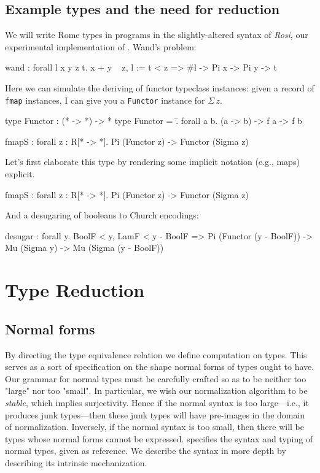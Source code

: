 \documentclass[authoryear, acmsmall, screen, review, nonacm]{acmart} %
\begin{document}
\subsection{Example types and the need for reduction}
We will write Rome types in programs in the slightly-altered syntax of \emph{Rosi}, our experimental implementation of \Rome. 
Wand's problem:

\begin{rosi}
wand : forall l x y z t. x + y ~ z, {l := t} < z => #l -> Pi x -> Pi y -> t
\end{rosi}

Here we can simulate the deriving of functor typeclass instances: given a record of \verb!fmap! instances, I can give you a \verb!Functor! instance for $\Sigma\, z$.

\begin{rosi}
type Functor : (* -> *) -> *
type Functor = \f. forall a b. (a -> b) -> f a -> f b

fmapS : forall z : R[* -> *]. Pi (Functor z) -> Functor (Sigma z)
\end{rosi}

Let's first elaborate this type by rendering some implicit notation (e.g., maps) explicit.

\begin{rosi}
fmapS : forall z : R[* -> *]. Pi (Functor z) -> Functor (Sigma z)
\end{rosi}

\Ni And a desugaring of booleans to Church encodings:

\begin{rosi}
desugar : forall y. BoolF < y, LamF < y - BoolF =>
          Pi (Functor (y - BoolF)) -> Mu (Sigma y) -> Mu (Sigma (y - BoolF))
\end{rosi}

\section{Type Reduction}
\subsection{Normal forms}

By directing the type equivalence relation we define computation on types. This serves as a sort of specification on the shape normal forms of types ought to have. Our grammar for normal types must be carefully crafted so as to be neither too "large" nor too "small". In particular, we wish our normalization algorithm to be \emph{stable}, which implies surjectivity. Hence if the normal syntax is too large---i.e., it produces junk types---then these junk types will have pre-images in the domain of normalization. Inversely, if the normal syntax is too small, then there will be types whose normal forms cannot be expressed.  specifies the syntax and typing of normal types, given as reference. We describe the syntax in more depth by describing its intrinsic mechanization.
\end{document}
